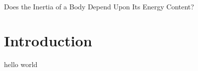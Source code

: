 \paperheader
	{Does the Inertia of a Body Depend Upon Its Energy Content?}
	{}
	{}


\section{Introduction}
hello world